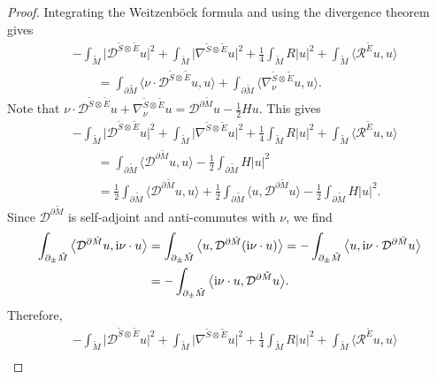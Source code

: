\documentclass[pdftex]{sigma}
\numberwithin{equation}{section}
\begin{document}
\begin{proof}
Integrating the Weitzenb\"ock formula and using the divergence theorem gives
\begin{align*}
&- \int_{\tilde{M}} \big|\mathcal{D}^{\tilde{S} \otimes \tilde{E}} u\big|^2 + \int_{\tilde{M}} \big|\nabla^{\tilde{S} \otimes \tilde{E}} u\big|^2 + \frac{1}{4} \int_{\tilde{M}} R |u|^2 + \int_{\tilde{M}} \big\langle \mathcal{R}^{\tilde{E}} u,u \big\rangle \\
&\qquad= \int_{\partial \tilde{M}} \big\langle \nu \cdot \mathcal{D}^{\tilde{S} \otimes \tilde{E}} u,u \big\rangle + \int_{\partial \tilde{M}} \big\langle \nabla^{\tilde{S} \otimes \tilde{E}}_\nu u,u \big\rangle.
\end{align*}
Note that $\nu \cdot \mathcal{D}^{\tilde{S} \otimes \tilde{E}} u + \nabla^{\tilde{S} \otimes \tilde{E}}_\nu u = \mathcal{D}^{\partial \tilde{M}} u - \frac{1}{2} H u$.
This gives
\begin{align*}
&- \int_{\tilde{M}} \big|\mathcal{D}^{\tilde{S} \otimes \tilde{E}} u\big|^2 + \int_{\tilde{M}} \big|\nabla^{\tilde{S} \otimes \tilde{E}} u\big|^2 + \frac{1}{4} \int_{\tilde{M}} R |u|^2 + \int_{\tilde{M}} \big\langle \mathcal{R}^{\tilde{E}} u,u \big\rangle \\
&\qquad= \int_{\partial \tilde{M}} \big\langle \mathcal{D}^{\partial \tilde{M}} u,u \big\rangle - \frac{1}{2} \int_{\partial \tilde{M}} H |u|^2 \\
&\qquad= \frac{1}{2} \int_{\partial \tilde{M}} \big\langle \mathcal{D}^{\partial \tilde{M}} u,u \big\rangle + \frac{1}{2} \int_{\partial \tilde{M}} \big\langle u,\mathcal{D}^{\partial \tilde{M}} u \big\rangle - \frac{1}{2} \int_{\partial \tilde{M}} H |u|^2.
\end{align*}
Since $\mathcal{D}^{\partial \tilde{M}}$ is self-adjoint and anti-commutes with $\nu$, we find
\begin{align*}
\int_{\partial_\pm \tilde{M}} \big\langle \mathcal{D}^{\partial \tilde{M}} u,{\rm i} \nu \cdot u \big\rangle
&=
\int_{\partial_\pm \tilde{M}} \big\langle u,\mathcal{D}^{\partial \tilde{M}}({\rm i} \nu \cdot u) \big\rangle =
-\int_{\partial_\pm \tilde{M}} \big\langle u,{\rm i} \nu \cdot\mathcal{D}^{\partial \tilde{M}} u \big\rangle \\
&=
-\int_{\partial_\pm \tilde{M}} \big\langle {\rm i} \nu \cdot u,\mathcal{D}^{\partial \tilde{M}} u \big\rangle .
\end{align*}
Therefore,
\begin{align}
& - \int_{\tilde{M}}\big|\mathcal{D}^{\tilde{S} \otimes \tilde{E}} u\big|^2 + \int_{\tilde{M}} \big|\nabla^{\tilde{S} \otimes \tilde{E}} u\big|^2 + \frac{1}{4} \int_{\tilde{M}} R |u|^2 + \int_{\tilde{M}} \big\langle \mathcal{R}^{\tilde{E}} u,u \big\rangle \nonumber\\

\end{align}
\end{proof}
\end{document}
